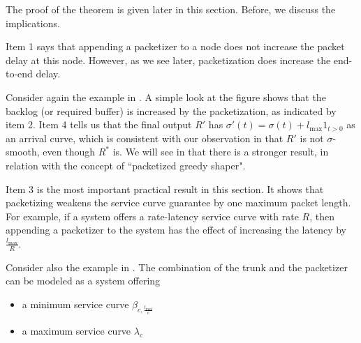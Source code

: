 The proof of the theorem is given later in this section. Before,
we discuss the implications.
\begin{figure}[!htbp]
\end{figure}
Item 1 says that appending a packetizer to a node does not
increase the packet delay at this node. However, as we see later,
packetization does increase the end-to-end delay.

Consider again the example in . A simple look at
the figure shows that the backlog (or required buffer) is
increased by the packetization, as indicated by item 2. Item 4
tells us that the final output $R'$ has $\sigma'(t)= \sigma(t) +
l_{\max} 1_{t>0}$ as an arrival curve, which is consistent with
our observation in  that $R'$ is not
$\sigma$-smooth, even though $R^*$ is. We will see in
 that there is a stronger result, in relation with
the concept of ``packetized greedy shaper".

Item 3 is the most important practical result in this section. It
shows that packetizing weakens the service curve guarantee by one
maximum packet length. For example, if a system offers a
rate-latency service curve with rate $R$, then appending a
packetizer to the system has the effect of increasing the latency
by $\frac{l_{\max}}{R}$.

 Consider also the example in .
 The combination of the
 trunk and the packetizer can be modeled as a system offering
\begin{itemize}
  \item a minimum service curve $\beta_{c,\frac{l_{\max}}{c}}$
  \item a maximum service curve $\lambda_c$
\end{itemize}


